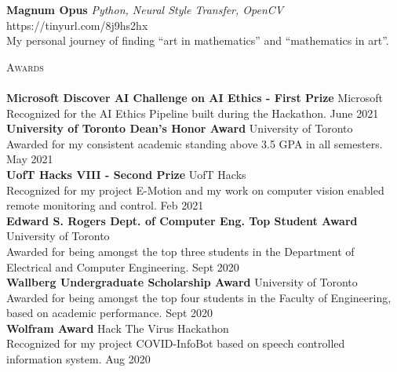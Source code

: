\documentclass[a4paper]{article}
\newcommand{\lineunder} {
    \vspace*{-8pt} \\
    \hspace*{-18pt} \hrulefill \\
}
\newcommand{\header} [1] {
    {\hspace*{-18pt}\vspace*{6pt} \textsc{#1}}
    \vspace*{-6pt} \lineunder
}
\begin{document}
\vspace*{1mm}
{\textbf{Magnum Opus}} {\sl Python, Neural Style Transfer, OpenCV} \hfill https://tinyurl.com/8j9hs2hx\\
My personal journey of finding “art in mathematics” and “mathematics in art”.\\
\vspace*{2mm}

\header{Awards}
\textbf{Microsoft Discover AI Challenge on AI Ethics - First Prize} \hfill Microsoft\\
Recognized for the AI Ethics Pipeline built during the Hackathon. \hfill June 2021\\
\vspace*{2mm}
\textbf{University of Toronto Dean’s Honor Award} \hfill University of Toronto\\
Awarded for my consistent academic standing above 3.5 GPA in all semesters. \hfill May 2021\\
\vspace*{2mm}
\textbf{UofT Hacks VIII - Second Prize} \hfill UofT Hacks\\
Recognized for my project E-Motion and my work on computer vision enabled remote monitoring and
control. \hfill Feb 2021\\
\vspace*{2mm}
\textbf{Edward S. Rogers Dept. of Computer Eng. Top Student Award} \hfill University of Toronto\\
Awarded for being amongst the top three students in the Department of Electrical and Computer
Engineering. \hfill Sept 2020\\
\vspace*{2mm}
\textbf{Wallberg Undergraduate Scholarship Award} \hfill University of Toronto\\
Awarded for being amongst the top four students in the Faculty of Engineering, based on academic
performance. \hfill Sept 2020\\
\vspace*{2mm}
\textbf{Wolfram Award} \hfill Hack The Virus Hackathon\\
Recognized for my project COVID-InfoBot based on speech controlled information system. \hfill Aug 2020\\
\end{document}
